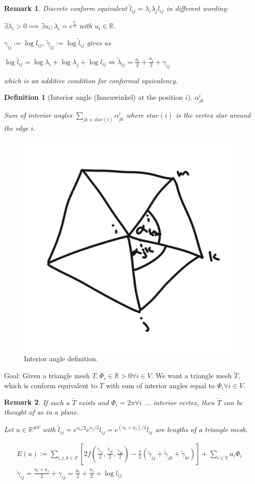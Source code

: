 \documentclass[]{article}
\newtheorem{definition}{Definition}
\newtheorem{remark}{Remark}
\begin{document}
\begin{remark}
	Discrete conform equivalent $\tilde{l}_{ij} = \lambda_i\lambda_j l_{ij}$ in different wording:
	
	$\exists \lambda_i > 0 \implies \exists u_i : \lambda_i = e^{\frac{u_i}{2}}$ with $u_i \in \mathbb{R}$.
	
	$\gamma_{ij} := \log l_{ij}$, $\tilde{\gamma}_{ij} := \log \tilde{l}_{ij}$ gives us
	
	$\log \tilde{l}_{ij} = \log \lambda_i + \log \lambda_j + \log l_{ij} \iff \tilde{\lambda}_{ij} = \frac{u_i}{2} + \frac{u_j}{2} + \gamma_{ij}$
	
	which is an additive condition for conformal equivalency.
\end{remark}

\begin{definition}[Interior angle (Innenwinkel) at the position $i$]
	
	$\alpha_{jk}^i$
	
	Sum of interior angles $\sum_{jk \in star(i)}\alpha_{jk}^i$ where $star(i)$ is the vertex star around the edge $i$.
\end{definition}

\begin{figure}[h!]
	\centering
	\includegraphics[width=0.3\linewidth]{figures/interior_angle}
	\caption{Interior angle definition.}
	\label{fig:interior_angle}
\end{figure}

Goal: Given a triangle mesh $T, \Phi_i \in \mathbb{R}{>0} \forall i \in V$. We want a triangle mesh $\tilde{T}$, which is conform equivalent to $T$ with sum of interior angles equal to $\Phi_i \forall i \in V$.

\begin{remark}
	If such a $\tilde{T}$ exists and $\Phi_i = 2\pi \forall i$ ... interior vertex, then $\tilde{T}$ can be thought of as in a plane.
	

	
	Let $u \in \mathbb{R}^{\# V}$ with $\tilde{l}_{ij} = e^{u_i/2} e^{u_j/2} l_{ij} = e^{(u_i+u_j)/2} l_{ij}$ are lengths of a triangle mesh.
	
	\begin{align*}
		E(u) := \sum_{i,j,k \in F} \left[2 f\left( \frac{\tilde{\gamma}_{ij}}{2}, \frac{\tilde{\gamma}_{jk}}{2}, \frac{\tilde{\gamma}_{ki}}{2} \right) - \frac{\pi}{2} (\tilde{\gamma}_{ij} + \tilde{\gamma}_{jk} + \tilde{\gamma}_{ki}) \right] + \sum_{i\in V} u_i \Phi_i\\
		\tilde{\gamma}_{ij} = \frac{u_i + u_j}{2} + \gamma_{ij} = \frac{u_i}{2} + \frac{u_j}{2} + \log l_{ij}
	\end{align*}
\end{remark}
\end{document}
